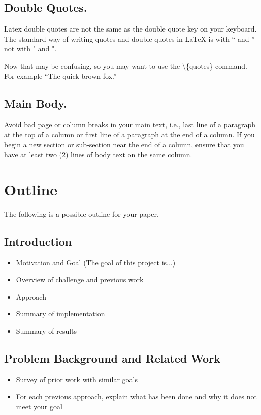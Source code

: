 \documentclass[pageno]{jpaper}
\newcommand{\quotes}[1]{``#1''}
\begin{document}
\subsection{Double Quotes.}

Latex double quotes are not the same as the double quote key on your
keyboard. The standard way of writing quotes and double quotes in
LaTeX is with `` and '' not with " and ".

Now that may be confusing, so you may want to use the \textbackslash\{quotes\} command.  For
example \quotes{The quick brown fox.}



\subsection{Main Body.}

Avoid bad page or column breaks in
your main text, i.e., last line of a paragraph at the top of a
column or first line of a paragraph at the end of a column. If you
begin a new section or sub-section near the end of a column,
ensure that you have at least two (2)  lines of body text on the same
column.

\section{Outline}
The following is a possible outline for your paper.
\subsection{Introduction}
\begin{itemize}
  \item Motivation and Goal (The goal of this project is...)
  \item Overview of challenge and previous work
  \item Approach
  \item Summary of implementation
  \item Summary of results
\end{itemize}

\subsection{Problem Background and Related Work}
\begin{itemize}
  \item Survey of prior work with similar goals
  \item For each previous approach, explain what has been done and why it does not meet your goal
\end{itemize}
\end{document}
